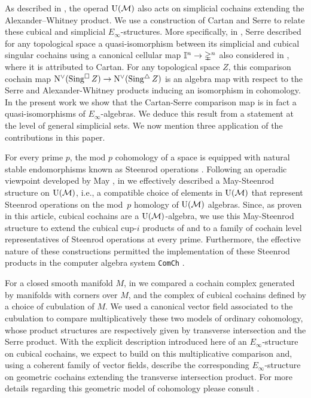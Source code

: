 As described in \cite{medina2020prop1}, the operad ${\operatorname{U}(\mathcal{M})}$ also acts on simplicial cochains extending the Alexander--Whitney product.
We use a construction of Cartan and Serre to relate these cubical and simplicial $E_\infty$-structures.
More specifically, in \cite[p. 442]{serre1951homologie}, Serre described for any topological space a quasi-isomorphism between its simplicial and cubical singular cochains using a canonical cellular map $\mathbb{I}^n \to \mathbb{\Delta}^n$ also considered in \cite[p.199]{eilenberg1953acyclic}, where it is attributed to Cartan.
For any topological space $Z$, this comparison cochain map $\operatorname{N^{\vee}}(\operatorname{Sing^{\square}} Z) \to \operatorname{N^{\vee}}(\operatorname{Sing^{\triangle}} Z)$ is an algebra map with respect to the Serre and Alexander-Whitney products inducing an isomorphism in cohomology.
In the present work we show that the Cartan-Serre comparison map is in fact a quasi-isomorphisms of $E_\infty$-algebras.
We deduce this result from a statement at the level of general simplicial sets.
We now mention three application of the contributions in this paper.

For every prime $p$, the mod $p$ cohomology of a space is equipped with natural stable endomorphisms known as Steenrod operations \cite{steenrod1962cohomology}.
Following an operadic viewpoint developed by May \cite{may1970general}, in \cite{medina2020maysteenrod} we effectively described a May-Steenrod structure on ${\operatorname{U}(\mathcal{M})}$, i.e., a compatible choice of elements in ${\operatorname{U}(\mathcal{M})}$ that represent Steenrod operations on the mod~$p$ homology of ${\operatorname{U}(\mathcal{M})}$ algebras.
Since, as proven in this article, cubical cochains are a ${\operatorname{U}(\mathcal{M})}$-algebra, we use this May-Steenrod structure to extend the cubical cup-$i$ products of \cite{kadeishvili2003cupi} and \cite{pilarczyk2016cubical} to a family of cochain level representatives of Steenrod operations at every prime.
Furthermore, the effective nature of these constructions permitted the implementation of these Steenrod products in the computer algebra system \texttt{ComCh} \cite{medina2021computer}.

For a closed smooth manifold $M$, in \cite{medina2021flowing} we compared a cochain complex generated by manifolds with corners over $M$, and the complex of cubical cochains defined by a choice of cubulation of $M$.
We used a canonical vector field associated to the cubulation to compare multiplicatively these two models of ordinary cohomology, whose product structures are respectively given by transverse intersection and the Serre product.
With the explicit description introduced here of an $E_\infty$-structure on cubical cochains, we expect to build on this multiplicative comparison and, using a coherent family of vector fields, describe the corresponding $E_\infty$-structure on geometric cochains extending the transverse intersection product.
For more details regarding this geometric model of cohomology please consult \cite{medina2021foundations}.

